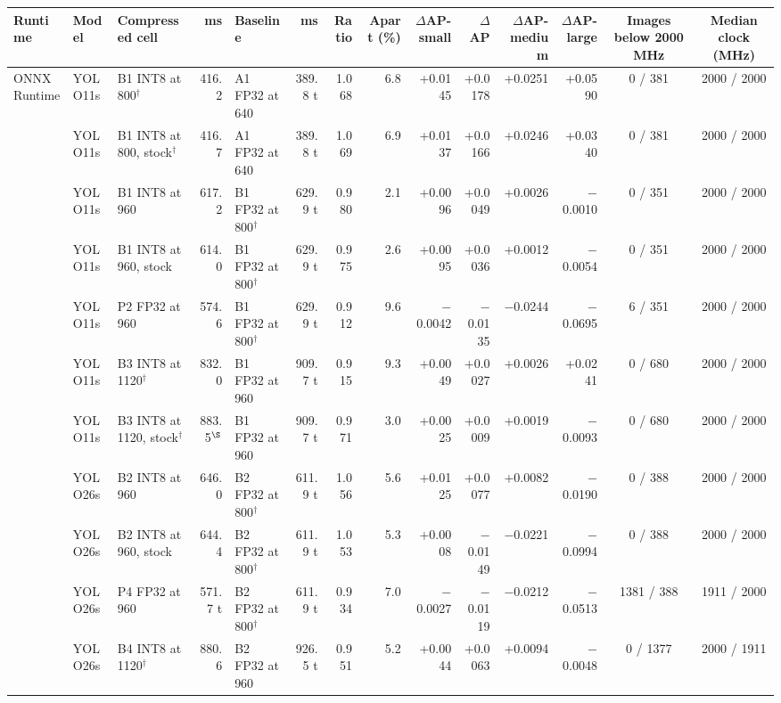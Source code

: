 \begin{tabular}{lllrlrrrrrrrcc}
\toprule
Runtime & Model & Compressed cell & ms & Baseline & ms & Ratio & Apart (\%) & $\Delta$AP-small & $\Delta$AP & $\Delta$AP-medium & $\Delta$AP-large & Images below 2000 MHz & Median clock (MHz) \\
\midrule
ONNX Runtime & YOLO11s & B1 INT8 at 800$^{\dagger}$ & 416.2 & A1 FP32 at 640 & 389.8 t & 1.068 & 6.8 & +0.0145 & +0.0178 & +0.0251 & +0.0590 & 0 / 381 & 2000 / 2000 \\
 & YOLO11s & B1 INT8 at 800, stock$^{\dagger}$ & 416.7 & A1 FP32 at 640 & 389.8 t & 1.069 & 6.9 & +0.0137 & +0.0166 & +0.0246 & +0.0340 & 0 / 381 & 2000 / 2000 \\
 & YOLO11s & B1 INT8 at 960 & 617.2 & B1 FP32 at 800$^{\dagger}$ & 629.9 t & 0.980 & 2.1 & +0.0096 & +0.0049 & +0.0026 & $-$0.0010 & 0 / 351 & 2000 / 2000 \\
 & YOLO11s & B1 INT8 at 960, stock & 614.0 & B1 FP32 at 800$^{\dagger}$ & 629.9 t & 0.975 & 2.6 & +0.0095 & +0.0036 & +0.0012 & $-$0.0054 & 0 / 351 & 2000 / 2000 \\
 & YOLO11s & P2 FP32 at 960 & 574.6 & B1 FP32 at 800$^{\dagger}$ & 629.9 t & 0.912 & 9.6 & $-$0.0042 & $-$0.0135 & $-$0.0244 & $-$0.0695 & 6 / 351 & 2000 / 2000 \\
 & YOLO11s & B3 INT8 at 1120$^{\dagger}$ & 832.0 & B1 FP32 at 960 & 909.7 t & 0.915 & 9.3 & +0.0049 & +0.0027 & +0.0026 & +0.0241 & 0 / 680 & 2000 / 2000 \\
 & YOLO11s & B3 INT8 at 1120, stock$^{\dagger}$ & 883.5$^{\S}$ & B1 FP32 at 960 & 909.7 t & 0.971 & 3.0 & +0.0025 & +0.0009 & +0.0019 & $-$0.0093 & 0 / 680 & 2000 / 2000 \\
 & YOLO26s & B2 INT8 at 960 & 646.0 & B2 FP32 at 800$^{\dagger}$ & 611.9 t & 1.056 & 5.6 & +0.0125 & +0.0077 & +0.0082 & $-$0.0190 & 0 / 388 & 2000 / 2000 \\
 & YOLO26s & B2 INT8 at 960, stock & 644.4 & B2 FP32 at 800$^{\dagger}$ & 611.9 t & 1.053 & 5.3 & +0.0008 & $-$0.0149 & $-$0.0221 & $-$0.0994 & 0 / 388 & 2000 / 2000 \\
 & YOLO26s & P4 FP32 at 960 & 571.7 t & B2 FP32 at 800$^{\dagger}$ & 611.9 t & 0.934 & 7.0 & $-$0.0027 & $-$0.0119 & $-$0.0212 & $-$0.0513 & 1381 / 388 & 1911 / 2000 \\
 & YOLO26s & B4 INT8 at 1120$^{\dagger}$ & 880.6 & B2 FP32 at 960 & 926.5 t & 0.951 & 5.2 & +0.0044 & +0.0063 & +0.0094 & $-$0.0048 & 0 / 1377 & 2000 / 1911 \\

\end{tabular}
